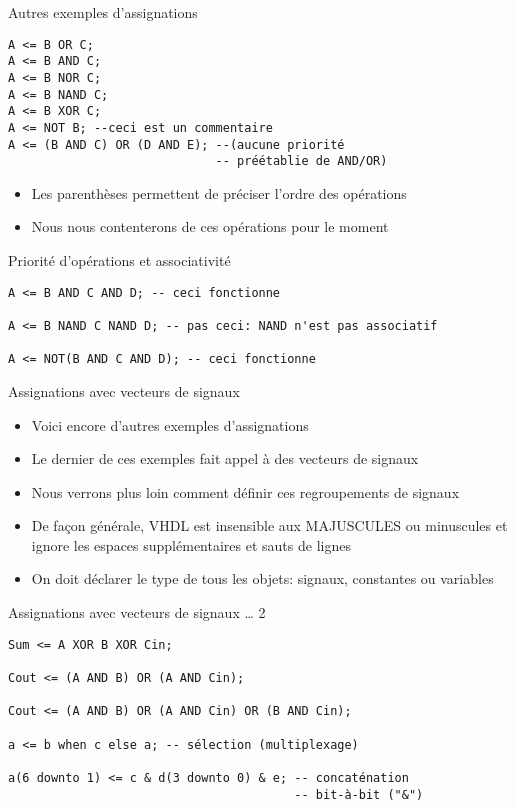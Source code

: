 \documentclass[presentation]{beamer}
\begin{document}
\begin{frame}[label={sec:org8e3fd6e},fragile]{Autres exemples d'assignations}
 \begin{verbatim}
A <= B OR C;
A <= B AND C;
A <= B NOR C;
A <= B NAND C;
A <= B XOR C;
A <= NOT B; --ceci est un commentaire
A <= (B AND C) OR (D AND E); --(aucune priorité 
                             -- préétablie de AND/OR)
\end{verbatim}

\begin{itemize}
\item Les parenthèses permettent de préciser l'ordre des opérations
\item Nous nous contenterons de ces opérations pour le moment
\end{itemize}
\end{frame}

\begin{frame}[label={sec:orgc857a95},fragile]{Priorité d'opérations et associativité}
 \begin{verbatim}
A <= B AND C AND D; -- ceci fonctionne

A <= B NAND C NAND D; -- pas ceci: NAND n'est pas associatif

A <= NOT(B AND C AND D); -- ceci fonctionne
\end{verbatim}
\end{frame}


\begin{frame}[label={sec:org403e2b2}]{Assignations avec vecteurs de signaux}
\begin{itemize}
\item Voici encore d'autres exemples d'assignations
\item Le dernier de ces exemples fait appel à des vecteurs de signaux
\item Nous verrons plus loin comment définir ces regroupements de signaux
\item De façon générale, VHDL est insensible aux MAJUSCULES ou minuscules et ignore les espaces supplémentaires et sauts de lignes
\item On doit déclarer le type de tous les objets: signaux, constantes ou variables
\end{itemize}
\end{frame}

\begin{frame}[label={sec:org1b818c1},fragile]{Assignations avec vecteurs de signaux \ldots{} 2}
 \begin{verbatim}
Sum <= A XOR B XOR Cin;

Cout <= (A AND B) OR (A AND Cin);

Cout <= (A AND B) OR (A AND Cin) OR (B AND Cin);

a <= b when c else a; -- sélection (multiplexage)

a(6 downto 1) <= c & d(3 downto 0) & e; -- concaténation 
                                        -- bit-à-bit ("&")

\end{verbatim}
\end{frame}
\end{document}
